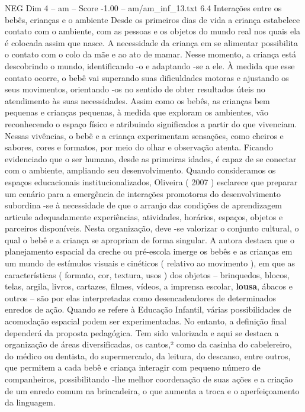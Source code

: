\begin{textsample}{NEG Dim 4 – am – Score -1.00 – am/am\_inf\_13.txt}  \label{ex:f4_neg_187}
6.4 Interações entre os bebês, crianças e o ambiente Desde os primeiros dias de vida a criança estabelece contato com o ambiente, com as pessoas e os objetos do mundo real nos quais ela é colocada assim que nasce.
A necessidade da criança em se alimentar possibilita o contato com o colo da mãe e ao ato de mamar.
Nesse momento, a criança está descobrindo o mundo, identificando -o e adaptando -se a ele.
À medida que esse contato ocorre, o bebê vai superando suas dificuldades motoras e ajustando os seus movimentos, orientando -os no sentido de obter resultados úteis no atendimento às suas necessidades.
Assim como os bebês, as crianças bem pequenas e crianças pequenas, à medida que exploram os ambientes, vão reconhecendo o espaço físico e atribuindo significados a partir do que vivenciam.
Nessas vivências, o bebê e a criança experimentam sensações, como cheiros e sabores, cores e formatos, por meio do olhar e observação atenta.
Ficando evidenciado que o ser humano, desde as primeiras idades, é capaz de se conectar com o ambiente, ampliando seu desenvolvimento.
Quando consideramos os espaços educacionais institucionalizados, Oliveira ( 2007 ) esclarece que preparar um cenário para a emergência de interações promotoras do desenvolvimento subordina -se à necessidade de que o arranjo das condições de aprendizagem articule adequadamente experiências, atividades, horários, espaços, objetos e parceiros disponíveis.
Nesta organização, deve -se valorizar o conjunto cultural, o qual o bebê e a criança se apropriam de forma singular.
A autora destaca que o planejamento espacial da creche ou pré-escola imerge os bebês e as crianças em um mundo de estímulos visuais e cinéticos ( relativo ao movimento ), em que as características ( formato, cor, textura, usos ) dos objetos – brinquedos, blocos, telas, argila, livros, cartazes, filmes, vídeos, a imprensa escolar, \textbf{lousa}, ábacos e outros – são por elas interpretadas como desencadeadores de determinados enredos de ação.
Quando se refere à Educação Infantil, várias possibilidades de acomodação espacial podem ser experimentadas.
No entanto, a definição final dependerá da proposta pedagógica.
Tem sido valorizada e aqui se destaca a organização de áreas diversificadas, os cantos,² como da casinha do cabelereiro, do médico ou dentista, do supermercado, da leitura, do descanso, entre outros, que permitem a cada bebê e criança interagir com pequeno número de companheiros, possibilitando -lhe melhor coordenação de suas ações e a criação de um enredo comum na brincadeira, o que aumenta a troca e o aperfeiçoamento da linguagem.

\end{textsample}
